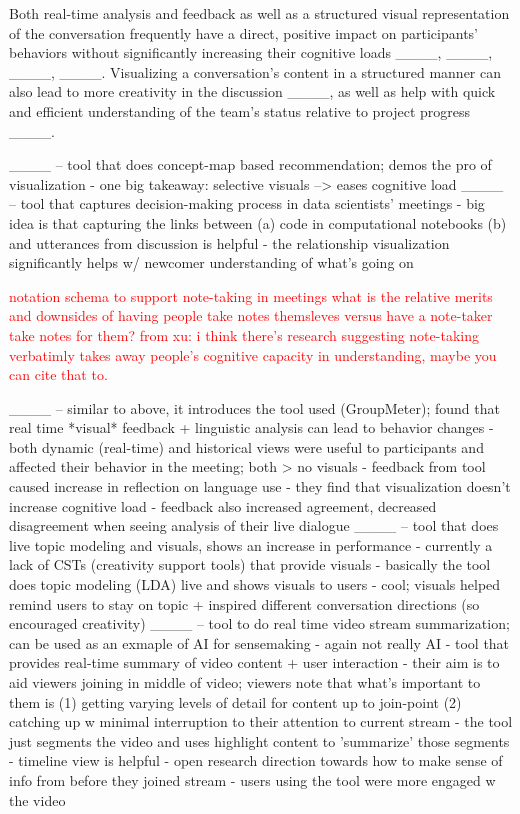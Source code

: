 Both real-time analysis and feedback as well as a structured visual representation of the conversation frequently have a direct, positive impact on participants' behaviors without significantly increasing their cognitive loads ____, ____, ____, ____. Visualizing a conversation's content in a structured manner can also lead to more creativity in the discussion ____, as well as help with quick and efficient understanding of the team's status relative to project progress ____.  

____ -- tool that does concept-map based recommendation; demos the pro of visualization
    - one big takeaway: selective visuals --> eases cognitive load
____ -- tool that captures decision-making process in data scientists' meetings
    - big idea is that capturing the links between (a) code in computational notebooks (b) and utterances from discussion is helpful
    - the relationship visualization significantly helps w/ newcomer understanding of what's going on

\textcolor{red}{notation schema to support note-taking in meetings}
\textcolor{red}{what is the relative merits and downsides of having people take notes themsleves versus have a note-taker take notes for them? }
\textcolor{red}{from xu: i think there's research suggesting note-taking verbatimly takes away people's cognitive capacity in understanding, maybe you can cite that to.}

____ -- similar to above, it introduces the tool used (GroupMeter); found that real time *visual* feedback + linguistic analysis can lead to behavior changes
    - both dynamic (real-time) and historical views were useful to participants and affected their behavior in the meeting; both > no visuals
    - feedback from tool caused increase in reflection on language use
    - they find that visualization doesn't increase cognitive load
    - feedback also increased agreement, decreased disagreement when seeing analysis of their live dialogue 
____ -- tool that does live topic modeling and visuals, shows an increase in performance
    - currently a lack of CSTs (creativity support tools) that provide visuals
    - basically the tool does topic modeling (LDA) live and shows visuals to users
    - cool; visuals helped remind users to stay on topic + inspired different conversation directions (so encouraged creativity)
____ -- tool to do real time video stream summarization; can be used as an exmaple of AI for sensemaking 
    - again not really AI
    - tool that provides real-time summary of video content + user interaction
    - their aim is to aid viewers joining in middle of video; viewers note that what's important to them is (1) getting varying levels of detail for content up to join-point (2) catching up w minimal interruption to their attention to current stream 
    - the tool just segments the video and uses highlight content to 'summarize' those segments
    - timeline view is helpful 
    - open research direction towards how to make sense of info from before they joined stream
    - users using the tool were more engaged w the video


